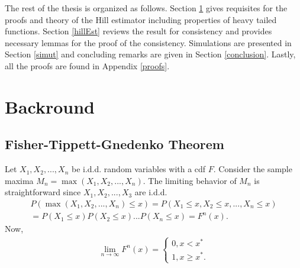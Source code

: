 \documentclass[english,12pt,a4paper,pdftex,sci,utf8]{aaltothesis} %
\newtheorem{definition}[theorem]{Definition}
\begin{document}
The rest of the thesis is organized as follows. Section \ref{backround} gives requisites for the proofs and theory of the Hill estimator including properties of heavy tailed functions. Section \ref{hillEst} reviews the result for consistency and provides necessary lemmas for the proof of the consistency. Simulations are presented in Section \ref{simut} and concluding remarks are given in Section \ref{conclusion}. Lastly, all the proofs are found in Appendix \ref{proofs}.


\thispagestyle{empty}




\clearpage

\section{Backround}
\label{backround}

\subsection{Fisher-Tippett-Gnedenko Theorem}
\label{domains}

Let $X_1, X_2, ..., X_n$ be i.d.d. random variables with a cdf $F$. Consider the sample maxima $M_n = \max(X_1, X_2, ..., X_n)$. The limiting behavior of $M_n$ is straightforward since $X_1, X_2,..., X_3$ are i.d.d.
\begin{gather*}
P(\max(X_1, X_2, ... , X_n) \leq x) = P(X_1 \leq x, X_2 \leq x,..., X_n \leq x) \\ = 
P(X_1 \leq x) P(X_2 \leq x) ... P(X_n \leq x)
=F^n(x).
\end{gather*}
Now,
\begin{gather*}
\lim_{n\to\infty} F^n(x) = 
\begin{cases}
0, x < x^* \\
1, x \geq x^*.
\end{cases}
\end{gather*}
\end{document}
